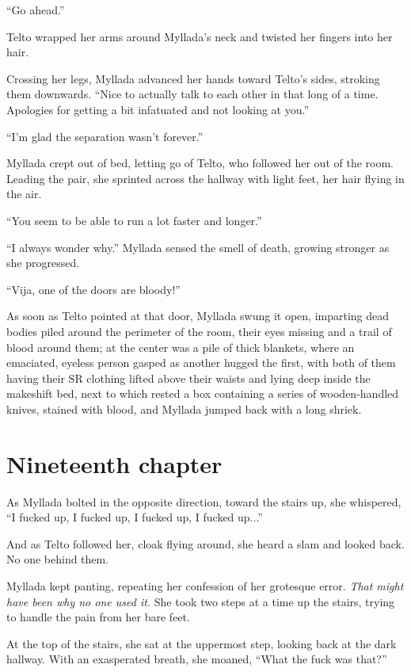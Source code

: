 ``Go ahead.''

Telto wrapped her arms around Myllada's neck and twisted her fingers into her hair.

Crossing her legs, Myllada advanced her hands toward Telto's sides, stroking them downwards. ``Nice to actually talk to each other in that long of a time. Apologies for getting a bit infatuated and not looking at you.''

``I'm glad the separation wasn't forever.''

Myllada crept out of bed, letting go of Telto, who followed her out of the room. Leading the pair, she sprinted across the hallway with light feet, her hair flying in the air.

``You seem to be able to run a lot faster and longer.''

``I always wonder why.'' Myllada sensed the smell of death, growing stronger as she progressed.

``Vija, one of the doors are bloody!''

As soon as Telto pointed at that door, Myllada swung it open, imparting dead bodies piled around the perimeter of the room, their eyes missing and a trail of blood around them; at the center was a pile of thick blankets, where an emaciated, eyeless person gasped as another hugged the first, with both of them having their SR clothing lifted above their waists and lying deep inside the makeshift bed, next to which rested a box containing a series of wooden-handled knives, stained with blood, and Myllada jumped back with a long shriek.

\chapter{Nineteenth chapter}

As Myllada bolted in the opposite direction, toward the stairs up, she whispered, ``I fucked up, I fucked up, I fucked up, I fucked up...''

And as Telto followed her, cloak flying around, she heard a slam and looked back. No one behind them.

Myllada kept panting, repeating her confession of her grotesque error. \emph{That might have been why no one used it.} She took two steps at a time up the stairs, trying to handle the pain from her bare feet.

At the top of the stairs, she sat at the uppermost step, looking back at the dark hallway. With an exasperated breath, she moaned, ``What the fuck was that?''

